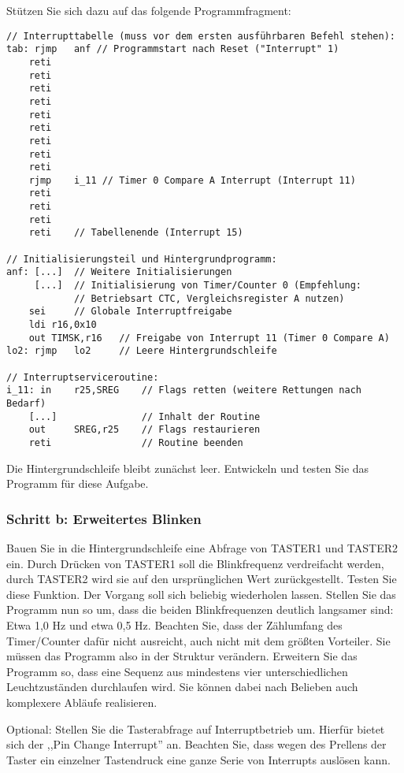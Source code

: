 \documentclass[a4paper,12pt,titlepage]{scrartcl}
\begin{document}
Stützen Sie sich dazu auf das folgende Programmfragment:
\begin{lstlisting}[basicstyle=\tiny]
// Interrupttabelle (muss vor dem ersten ausführbaren Befehl stehen):
tab: rjmp   anf // Programmstart nach Reset ("Interrupt" 1)
    reti
    reti
    reti
    reti
    reti
    reti
    reti
    reti
    reti
    rjmp    i_11 // Timer 0 Compare A Interrupt (Interrupt 11)
    reti
    reti
    reti
    reti    // Tabellenende (Interrupt 15)

// Initialisierungsteil und Hintergrundprogramm:
anf: [...]  // Weitere Initialisierungen
     [...]  // Initialisierung von Timer/Counter 0 (Empfehlung:
            // Betriebsart CTC, Vergleichsregister A nutzen)
    sei     // Globale Interruptfreigabe
    ldi r16,0x10
    out TIMSK,r16   // Freigabe von Interrupt 11 (Timer 0 Compare A)
lo2: rjmp   lo2     // Leere Hintergrundschleife

// Interruptserviceroutine:
i_11: in    r25,SREG    // Flags retten (weitere Rettungen nach Bedarf)
    [...]               // Inhalt der Routine
    out     SREG,r25    // Flags restaurieren
    reti                // Routine beenden
\end{lstlisting}

Die Hintergrundschleife bleibt zunächst leer. Entwickeln und testen Sie das Programm für diese Aufgabe.

\subsubsection*{Schritt b: Erweitertes Blinken}
Bauen Sie in die Hintergrundschleife eine Abfrage von TASTER1 und TASTER2 ein. Durch Drücken von TASTER1 soll die Blinkfrequenz verdreifacht werden, durch TASTER2 wird sie auf den ursprünglichen Wert zurückgestellt.
Testen Sie diese Funktion. Der Vorgang soll sich beliebig wiederholen lassen.
Stellen Sie das Programm nun so um, dass die beiden Blinkfrequenzen deutlich langsamer sind: Etwa 1,0 Hz und etwa 0,5 Hz. Beachten Sie, dass der Zählumfang des Timer/Counter dafür nicht ausreicht, auch nicht mit dem größten Vorteiler. Sie müssen das Programm also in der Struktur verändern.
Erweitern Sie das Programm so, dass eine Sequenz aus mindestens vier unterschiedlichen Leuchtzuständen durchlaufen wird. Sie können dabei nach Belieben auch komplexere Abläufe realisieren.

Optional: Stellen Sie die Tasterabfrage auf Interruptbetrieb um. Hierfür bietet sich der ,,Pin Change Interrupt'' an. Beachten Sie, dass wegen des Prellens der Taster ein einzelner Tastendruck eine ganze Serie von Interrupts auslösen kann.
\end{document}
